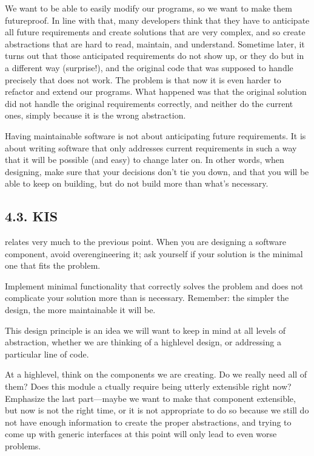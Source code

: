 \documentclass[a4paper,10pt,english]{sphinxmanual}
\begin{document}
We want to be able to easily modify our programs, so we want to make them future\sphinxhyphen{}proof. In line with that,
many developers think that they have to anticipate all future requirements and create solutions that are very
complex, and so create abstractions that are hard to read, maintain, and understand. Sometime later, it turns
out that those anticipated requirements do not show up, or they do but in a different way (surprise!), and the
original code that was supposed to handle precisely that does not work. The problem is that now it is even
harder to refactor and extend our programs. What happened was that the original solution did not handle the
original requirements correctly, and neither do the current ones, simply because it is the wrong abstraction.

Having maintainable software is not about anticipating future requirements. It is about writing software that
only addresses current requirements in such a way that it will be possible (and easy) to change later on. In
other words, when designing, make sure that your decisions don’t tie you down, and that you will be able to
keep on building, but do not build more than what’s necessary.


\subsection{4.3. KIS}
\label{\detokenize{chapters/3_general_traits/index:kis}}
 relates very much to the previous point. When you are designing a software
component, avoid over\sphinxhyphen{}engineering it; ask yourself if your solution is the minimal one that fits the problem.

Implement minimal functionality that correctly solves the problem and does not complicate your solution more
than is necessary. Remember: the simpler the design, the more maintainable it will be.

This design principle is an idea we will want to keep in mind at all levels of abstraction, whether we are
thinking of a high\sphinxhyphen{}level design, or addressing a particular line of code.

At a high\sphinxhyphen{}level, think on the components we are creating. Do we really need all of them? Does this module a
ctually require being utterly extensible right now? Emphasize the last part—maybe we want to make that
component extensible, but now is not the right time, or it is not appropriate to do so because we still do not
have enough information to create the proper abstractions, and trying to come up with generic interfaces at
this point will only lead to even worse problems.
\end{document}
